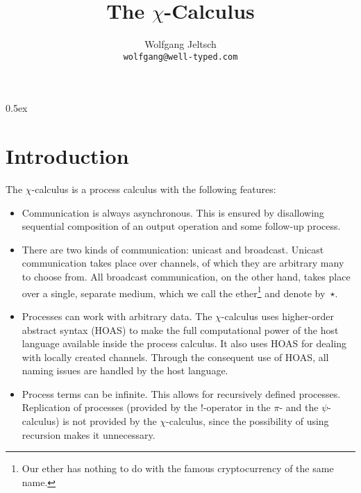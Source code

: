 \documentclass[a4paper,11pt]{article}
\begin{document}
\title{The $\chi$-Calculus}
\author{Wolfgang Jeltsch\\\small\texttt{wolfgang@well-typed.com}}

\maketitle

\tableofcontents

\parindent 0pt\parskip 0.5ex

\section{Introduction}

The $\chi$-calculus is a process calculus with the following features:
\begin{itemize}

\item

Communication is always asynchronous. This is ensured by disallowing sequential composition of an
output operation and some follow-up process.

\item

There are two kinds of communication: unicast and broadcast. Unicast communication takes place over
channels, of which they are arbitrary many to choose from. All broadcast communication, on the other
hand, takes place over a single, separate medium, which we call the ether\footnote{Our ether has
nothing to do with the famous cryptocurrency of the same name.} and denote by~$\star$.

\item

Processes can work with arbitrary data. The $\chi$-calculus uses higher-order abstract syntax (HOAS)
to make the full computational power of the host language available inside the process calculus. It
also uses HOAS for dealing with locally created channels. Through the consequent use of HOAS, all
naming issues are handled by the host language.

\item

Process terms can be infinite. This allows for recursively defined processes. Replication of
processes (provided by the $!$-operator in the $\pi$- and the $\psi$-calculus) is not provided by
the $\chi$-calculus, since the possibility of using recursion makes it unnecessary.

\end{itemize}


\end{document}
